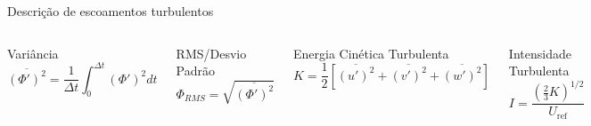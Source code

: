 \documentclass[10pt]{beamer}
\newcommand{\m}[1]{\overline{#1}}
\begin{document}
\begin{frame}[fragile]{Descrição de escoamentos turbulentos}
	\begin{columns}
		\begin{block}{Variância}
			\begin{equation*}
			\m{(\Phi')^2} = \dfrac{1}{\Delta t} \int_{0}^{\Delta t} (\Phi')^2 dt
			\end{equation*}
		\end{block}
		\begin{block}{RMS/Desvio Padrão}
			\begin{equation*}
			\Phi_{RMS} = \sqrt{\m{(\Phi')^2}}
			\end{equation*}
		\end{block}
		\begin{block}{Energia Cinética Turbulenta}
			\begin{equation*}
			K = \dfrac{1}{2} \left[ \m{(u')^2} + \m{(v')^2} + \m{(w')^2} \right]
			\end{equation*}
		\end{block}
		
		\begin{block}{Intensidade Turbulenta}
			\begin{equation*}
			I = \dfrac{\left(\frac{2}{3} K \right)^{1/2}}{U_{\text{ref}}}
			\end{equation*}
		\end{block}
	\end{columns}

\end{frame}
\end{document}
